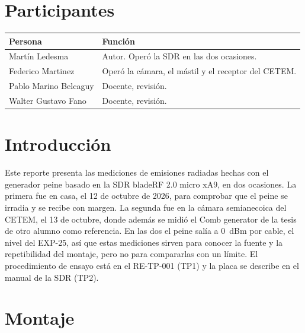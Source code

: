 \documentclass[11pt,a4paper]{article}
\begin{document}
\section*{Participantes}
\begin{tabular}{@{}lp{10cm}@{}}
  \toprule
  Persona & Función \\
  \midrule
  Martín Ledesma        & Autor. Operó la SDR en las dos ocasiones. \\
  Federico Martinez     & Operó la cámara, el mástil y el receptor del CETEM. \\
  Pablo Marino Belcaguy & Docente, revisión. \\
  Walter Gustavo Fano   & Docente, revisión. \\
  \bottomrule
\end{tabular}

\tableofcontents

\section{Introducción}

Este reporte presenta las mediciones de emisiones radiadas hechas con el generador peine basado en la SDR bladeRF 2.0 micro xA9, en dos ocasiones. La primera fue en casa, el 12 de octubre de 2026, para comprobar que el peine se irradia y se recibe con margen. La segunda fue en la cámara semianecoica del CETEM, el 13 de octubre, donde además se midió el Comb generator de la tesis de otro alumno como referencia. En las dos el peine salía a 0~dBm por cable, el nivel del EXP-25, así que estas mediciones sirven para conocer la fuente y la repetibilidad del montaje, pero no para compararlas con un límite. El procedimiento de ensayo está en el RE-TP-001 (TP1) y la placa se describe en el manual de la SDR (TP2).

\section{Montaje}
\end{document}
